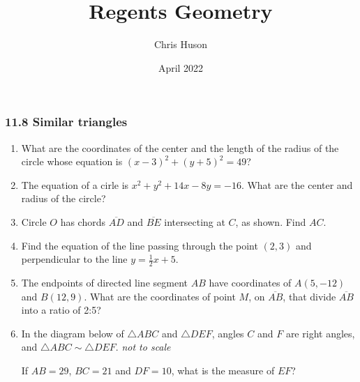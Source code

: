 \documentclass[12pt, oneside]{article}
\title{Regents Geometry}
\author{Chris Huson}
\date{April 2022}
\begin{document}
\subsubsection*{11.8 Similar triangles}
\begin{enumerate}[itemsep=2cm]
\item What are the coordinates of the center and the length of the radius of the circle whose equation is $(x-3)^2+(y+5)^2=49$? \vspace{1cm}
  
\item The equation of a cirle is $x^2+y^2+14x-8y=-16$. What are the center and radius of the circle?

\item Circle $O$ has chords $\overline{AD}$ and $\overline{BE}$ intersecting at $C$, as shown. Find $AC$.\\

\item Find the equation of the line passing through the point $(2,3)$ and perpendicular to the line $\displaystyle y=\frac{1}{2}x+5$.
  
\item The endpoints of directed line segment $AB$ have coordinates of
$A(5,-12)$ and $B(12,9)$. What are the coordinates of point $M$, on $\overline{AB}$, that divide $\overline{AB}$ into a ratio of 2:5?

\newpage
\item In the diagram below of $\triangle ABC$ and $\triangle DEF$, angles $C$ and $F$ are right angles, and $\triangle ABC \sim \triangle DEF$. \hfill \emph{not to scale}
  \begin{center}
  \end{center}
If $AB=29$, $BC=21$ and $DF=10$, what is the measure of $EF$?


\end{enumerate}
\end{document}
